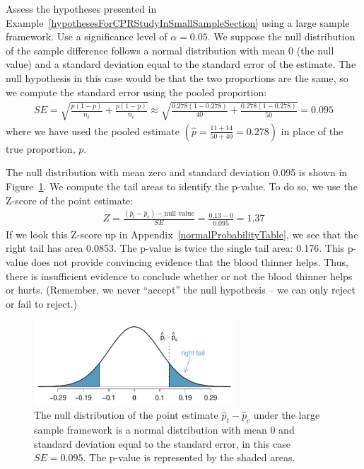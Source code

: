\begin{example}{Assess the hypotheses presented in Example~\ref{hypothesesForCPRStudyInSmallSampleSection} using a large sample framework. Use a significance level of $\alpha=0.05$.}
We suppose the null distribution of the sample difference follows a normal distribution with mean 0 (the null value) and a standard deviation equal to the standard error of the estimate. The null hypothesis in this case would be that the two proportions are the same, so we compute the standard error using the pooled proportion:
\begin{align*}
SE = \sqrt{\frac{p(1-p)}{n_t} + \frac{p(1-p)}{n_c}}
	\approx \sqrt{\frac{0.278(1-0.278)}{40} + \frac{0.278(1-0.278)}{50}} = 0.095
\end{align*}
where we have used the pooled estimate $\left( \hat{p} = \frac{11+14}{50 + 40} = 0.278 \right)$ in place of the true proportion, $p$.

The null distribution with mean zero and standard deviation 0.095 is shown in Figure~\ref{pValueCPRStudyLargeSampleAnalysisInSmallSampleSection}. We compute the tail areas to identify the p-value. To do so, we use the Z-score of the point estimate:
\begin{align*}
Z = \frac{(\hat{p}_t - \hat{p}_c) - \text{null value}}{SE} = \frac{0.13 - 0}{0.095} = 1.37
\end{align*}
If we look this Z-score up in Appendix~\ref{normalProbabilityTable}, we see that the right tail has area 0.0853. The p-value is twice the single tail area: 0.176. This p-value does not provide convincing evidence that the blood thinner helps. Thus, there is insufficient evidence to conclude whether or not the blood thinner helps or hurts. (Remember, we never ``accept'' the null hypothesis -- we can only reject or fail to reject.)
\end{example}
\begin{figure}[ht]
\centering
\includegraphics[width=0.67\textwidth]{ch_inference_for_props/figures/pValueCPRStudyLargeSampleAnalysisInSmallSampleSection/pValueCPRStudyLargeSampleAnalysisInSmallSampleSection}
\caption{The null distribution of the point estimate $\hat{p}_t - \hat{p}_c$ under the large sample framework is a normal distribution with mean $0$ and standard deviation equal to the standard error, in this case $SE=0.095$. The p-value is represented by the shaded areas.}
\label{pValueCPRStudyLargeSampleAnalysisInSmallSampleSection}
\end{figure}

